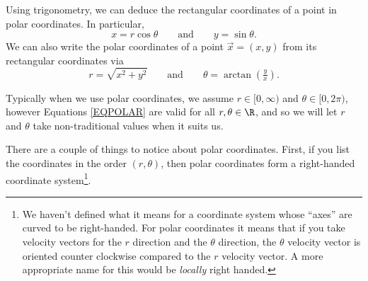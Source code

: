 Using trigonometry, we can deduce the rectangular coordinates of a point in polar coordinates.
In particular,
\begin{equation}
	\label{EQPOLAR}
	x=r\cos\theta\qquad\text{and}\qquad y=\sin\theta.
\end{equation}
We can also write the polar coordinates of a point $\vec x=(x,y)$ from its rectangular coordinates via
\[
	r=\sqrt{x^2+y^2}\qquad\text{and}\qquad \theta=\arctan\left( \tfrac{y}{x}\right).
\]

Typically when we use polar coordinates, we assume $r\in[0,\infty)$ and $\theta\in[0,2\pi)$, however
Equations \eqref{EQPOLAR} are valid for all $r,\theta\in\R$, and so we will let
$r$ and $\theta$ take non-traditional values when it suits us.

There are a couple of things to notice about polar coordinates.  First, if you list
the coordinates in the order $(r,\theta)$, then polar coordinates form a right-handed
coordinate system\footnote{ We haven't defined what it means for a coordinate system
whose ``axes'' are curved to be right-handed.  For polar coordinates it means that if
you take velocity vectors for the $r$ direction and the $\theta$ direction, the $\theta$
velocity vector is oriented counter clockwise compared to the $r$ velocity vector.  A more
appropriate name for this would be \emph{locally} right handed.}. 

